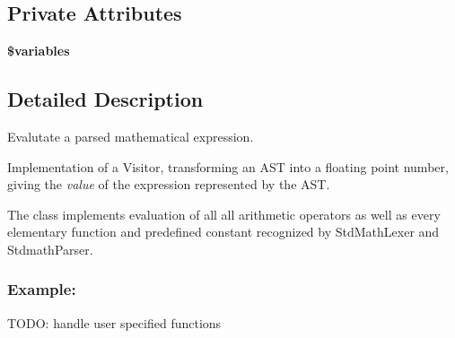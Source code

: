 \subsection*{Private Attributes}
\begin{DoxyCompactItemize}
\item 
\hypertarget{classMathParser_1_1Interpreting_1_1Evaluator_ac43d7a3d54117fba595e227fef653e5d}{{\bfseries \$variables}}\label{classMathParser_1_1Interpreting_1_1Evaluator_ac43d7a3d54117fba595e227fef653e5d}

\end{DoxyCompactItemize}


\subsection{Detailed Description}
Evalutate a parsed mathematical expression. 

Implementation of a Visitor, transforming an A\-S\-T into a floating point number, giving the {\itshape value} of the expression represented by the A\-S\-T.

The class implements evaluation of all all arithmetic operators as well as every elementary function and predefined constant recognized by Std\-Math\-Lexer and Stdmath\-Parser.

\subsubsection*{Example\-:}




T\-O\-D\-O\-: handle user specified functions 

